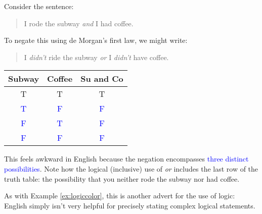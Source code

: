 \begin{example}{}{}
	Consider the sentence:\par
	\begin{minipage}[t]{0.6\linewidth}\vspace{-1pt}
	\begin{quote}
		I rode the subway \emph{and} I had coffee.
	\end{quote}
	To negate this using de Morgan's first law, we might write:
	\begin{quote}
		I \emph{didn't} ride the subway \emph{or} I \emph{didn't} have coffee.
	\end{quote}
	\end{minipage}
	\hfill
	\begin{minipage}[t]{0.39\linewidth}\vspace{-20pt}
		\flushright	
		\begin{tabular}{c|c||c}
			Subway&Coffee&Su and Co\\\hline\hline
			T & T & T\\
			\textcolor{blue}{T} & \textcolor{blue}{F} & \textcolor{blue}{F}\\
			\textcolor{blue}{F} & \textcolor{blue}{T} & \textcolor{blue}{F}\\
			\textcolor{blue}{F} & \textcolor{blue}{F} &\textcolor{blue}{F}
		\end{tabular}
	\end{minipage}\bigbreak
	
	This feels awkward in English because the negation encompasses \textcolor{blue}{three distinct possibilities}. Note how the logical (inclusive) use of \emph{or} includes the last row of the truth table: the possibility that you neither rode the subway nor had coffee.
\end{example}

As with Example \ref{ex:logiccolor}, this is another advert for the use of logic: English simply isn't very helpful for precisely stating complex logical statements.


